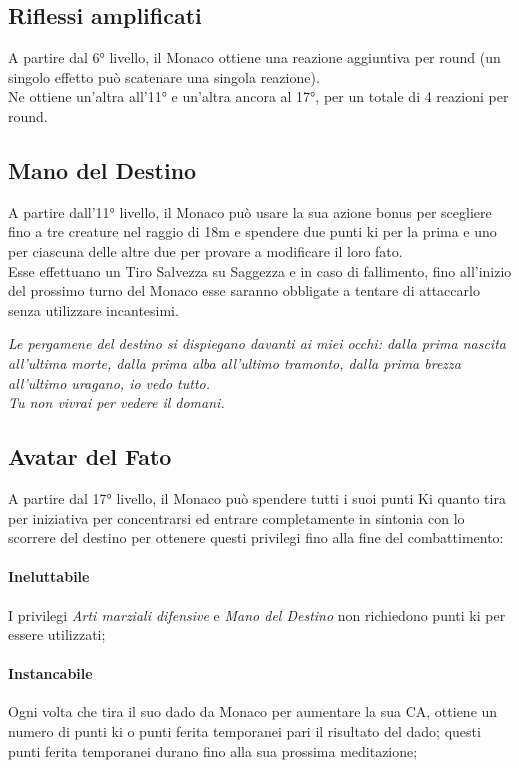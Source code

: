 \documentclass[letterpaper,twocolumn,openany,nodeprecatedcode]{dndbook}
\begin{document}
\subsection{Riflessi amplificati}
A partire dal 6° livello, il Monaco ottiene una reazione aggiuntiva per round (un singolo effetto può scatenare una singola reazione).\\
Ne ottiene un'altra all'11° e un'altra ancora al 17°, per un totale di 4 reazioni per round.

\subsection{Mano del Destino}
A partire dall'11° livello, il Monaco può usare la sua azione bonus per scegliere fino a tre creature nel raggio di 18m e spendere due punti ki per la prima e uno per ciascuna delle altre due per provare a modificare il loro fato.\\
Esse effettuano un Tiro Salvezza su Saggezza e in caso di fallimento, fino all'inizio del prossimo turno del Monaco esse saranno obbligate a tentare di attaccarlo senza utilizzare incantesimi.

\begin{DndReadAloud}
  \it
  Le pergamene del destino si dispiegano davanti ai miei occhi: dalla prima nascita all'ultima morte, dalla prima alba all'ultimo tramonto, dalla prima brezza all'ultimo uragano, io vedo tutto.\\
  Tu non vivrai per vedere il domani.
\end{DndReadAloud}

\subsection{Avatar del Fato}
A partire dal 17° livello, il Monaco può spendere tutti i suoi punti Ki quanto tira per iniziativa per concentrarsi ed entrare completamente in sintonia con lo scorrere del destino per ottenere questi privilegi fino alla fine del combattimento:
\paragraph{Ineluttabile} I privilegi \textit{Arti marziali difensive} e \textit{Mano del Destino} non richiedono punti ki per essere utilizzati;
\paragraph{Instancabile} Ogni volta che tira il suo dado da Monaco per aumentare la sua CA, ottiene un numero di punti ki o punti ferita temporanei pari il risultato del dado; questi punti ferita temporanei durano fino alla sua prossima meditazione;
\end{document}
